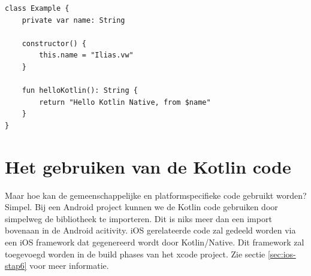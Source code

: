 \begin{lstlisting}
class Example {
	private var name: String
	
	constructor() {
		this.name = "Ilias.vw"
	}
	
	fun helloKotlin(): String {
		return "Hello Kotlin Native, from $name"
	}
}
\end{lstlisting}

\section {Het gebruiken van de Kotlin code}
\label{sec:use-ios-code}
Maar hoe kan de gemeenschappelijke en platformspecifieke code gebruikt worden? Simpel. Bij een Android project kunnen we de Kotlin code gebruiken door simpelweg de bibliotheek te importeren. Dit is niks meer dan een import bovenaan in de Android acitivity. iOS gerelateerde code zal gedeeld worden via een iOS framework dat gegenereerd wordt door Kotlin/Native. Dit framework zal toegevoegd worden in de build phases van het xcode project. Zie sectie \ref{sec:ios-stap6} voor meer informatie.